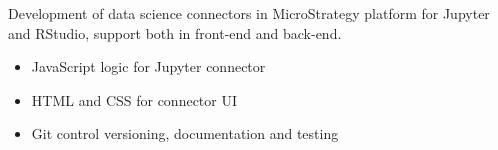 \documentclass[10pt,a4paper,ragged2e,withhyper]{altacv}
\begin{document}
\begin{paracol}{2}
\medskip
\divider

Development of data science connectors in MicroStrategy platform for Jupyter and RStudio, support both in front-end and back-end. 
\smallskip
\begin{itemize}
\item JavaScript logic for Jupyter connector
\item HTML and CSS for connector UI
\item Git control versioning, documentation and testing
\end{itemize}







\switchcolumn










\\


\end{paracol}
\end{document}
